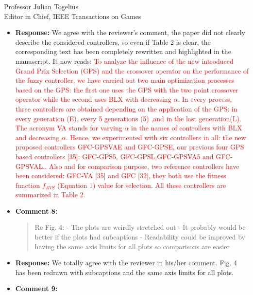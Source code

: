\documentclass[10pt]{letter} %
\begin{document}
\begin{letter}{Professor Julian Togelius \\ Editor in Chief, IEEE Transactions on Games}
\begin{enumerate}
\begin{itemize}
\begin{quote}
					I still have some issues with the experimental evaluation:
					- It would help if you could make clearer what abbreviation you are using for which controller. "VA", e.g. was never mentioned as an abbreviation for the crossover. On page 6, line 40, you also mention GVC-VA twice. Table 2 helps a lot, but the text on its own is not entirely clear.
				\end{quote}	
			\item {\bf Response:} 
			We agree with the reviewer's comment, the paper did not clearly describe the considered controllers, so even if Table 2 is clear, the corresponding text has been completely rewritten and highlighted in the manuscript. It now reads:
			\textcolor{red}{
				To analyze the influence of the new introduced Grand
				Prix Selection (GPS) and the crossover operator on the
				performance of the fuzzy controller, we have carried out two
				main optimization processes based on the GPS: the first one
				uses the GPS with the two point crossover operator while
				the second uses BLX with decreasing $\alpha$. In every process,
				three controllers are obtained depending on the application
				of the GPS: in every generation (E), every 5 generations
				(5) ,and in the last generation(L). The acronym VA stands
				for varying $\alpha$ in the names of controllers with BLX and
			decreasing $\alpha$.  Hence, we experimented with six controllers
				in all: the new proposed controllers GFC-GPSVAE and
				GFC-GPSE, our previous four GPS based controllers [35]:
				GFC-GPS5, GFC-GPSL,GFC-GPSVA5 and GFC-GPSVAL..
				Also and for comparison purpose, two reference controllers
				have been considered: GFC-VA [35] and GFC [32], they
				both use the fitness function $f_{AVS}$ (Equation 1) value for
				selection. All these controllers are summarized in Table 2.
			}
			\item {\bf Comment 8:}
				\begin{quote}	
					Re Fig. 4:
					- The plots are weirdly stretched out
					- It probably would be better if the plots had subcaptions
					- Readability could be improved by having the same axis limits for all plots so comparisons are easier
				\end{quote}	
			\item {\bf Response:} 
				We totally agree with the reviewer in his/her comment. Fig. 4 has been redrawn with subcaptions and the same axis limits for all plots.
			\item {\bf Comment 9:}
				\begin{quote}	

\end{quote}
\end{itemize}
\end{enumerate}
\end{letter}
\end{document}
